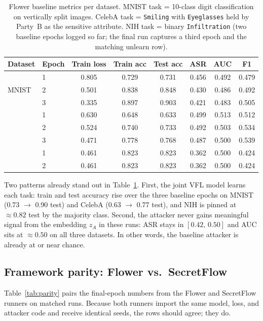 \documentclass[letterpaper,twocolumn,10pt]{article}
\begin{document}
\begin{table}[t]
\centering
\small
\caption{Flower baseline metrics per dataset. MNIST task = 10-class digit
classification on vertically split images. CelebA task = \texttt{Smiling}
with \texttt{Eyeglasses} held by Party~B as the sensitive attribute.
NIH task = binary \texttt{Infiltration} (two baseline epochs logged so
far; the final run captures a third epoch and the matching unlearn row).}
\label{tab:baseline}
\begin{tabular}{@{}llcccccc@{}}
\toprule
Dataset & Epoch & Train loss & Train acc & Test acc & ASR & AUC & F1 \\
\midrule
\multirow{3}{*}{MNIST}
    & 1 & 0.805 & 0.729 & 0.731 & 0.456 & 0.492 & 0.479 \\
    & 2 & 0.501 & 0.838 & 0.848 & 0.430 & 0.486 & 0.492 \\
    & 3 & 0.335 & 0.897 & 0.903 & 0.421 & 0.483 & 0.505 \\
\addlinespace[2pt]
\multirow{3}{*}{CelebA}
    & 1 & 0.630 & 0.648 & 0.633 & 0.499 & 0.513 & 0.512 \\
    & 2 & 0.524 & 0.740 & 0.733 & 0.492 & 0.503 & 0.534 \\
    & 3 & 0.471 & 0.778 & 0.768 & 0.487 & 0.500 & 0.539 \\
\addlinespace[2pt]
\multirow{2}{*}{NIH Chest X-ray14}
    & 1 & 0.461 & 0.823 & 0.823 & 0.362 & 0.500 & 0.424 \\
    & 2 & 0.461 & 0.823 & 0.823 & 0.362 & 0.500 & 0.424 \\
\bottomrule
\end{tabular}
\end{table}

Two patterns already stand out in Table~\ref{tab:baseline}. First, the
joint VFL model learns each task: train and test accuracy rise over the
three baseline epochs on MNIST (0.73 $\rightarrow$ 0.90 test) and CelebA
(0.63 $\rightarrow$ 0.77 test), and NIH is pinned at $\approx 0.82$ test
by the majority class. Second, the attacker never gains meaningful
signal from the embedding $z_A$ in these runs: ASR stays in
$[0.42,\,0.50]$ and AUC sits at $\approx 0.50$ on all three datasets. In
other words, the baseline attacker is already at or near chance.

\subsection{Framework parity: Flower vs.\ SecretFlow}

Table~\ref{tab:parity} pairs the final-epoch numbers from the Flower and
SecretFlow runners on matched runs. Because both runners import the same
model, loss, and attacker code and receive identical seeds, the rows
should agree; they do.
\end{document}
